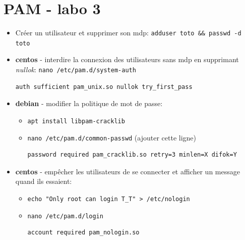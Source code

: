 \documentclass[a4paper]{article}
\begin{document}
\newpage \section{PAM - labo 3}





\begin{itemize}


\item Créer un utilisateur et supprimer son mdp: \texttt{adduser toto \&\& passwd -d toto}


\item \textbf{centos} - interdire la connexion des utilisateurs sans mdp en supprimant \textit{nullok}: \texttt{nano /etc/pam.d/system-auth}
\begin{example} \begin{verbatim}
auth sufficient pam_unix.so nullok try_first_pass
\end{verbatim} \end{example}


\item \textbf{debian} - modifier la politique de mot de passe:
\begin{itemize}
    \item \texttt{apt install libpam-cracklib}
    \item \texttt{nano /etc/pam.d/common-passwd} (ajouter cette ligne)
\begin{example} \begin{verbatim}
password required pam_cracklib.so retry=3 minlen=X difok=Y
\end{verbatim} \end{example}
\end{itemize}


\item \textbf{centos} - empêcher les utilisateurs de se connecter et afficher un message quand ils essaient:
\begin{itemize}
    \item \texttt{echo "Only root can login T\_T" > /etc/nologin}
    \item \texttt{nano /etc/pam.d/login}
\begin{example} \begin{verbatim}
account required pam_nologin.so
\end{verbatim} \end{example}
\end{itemize}



\end{itemize}
\end{document}
